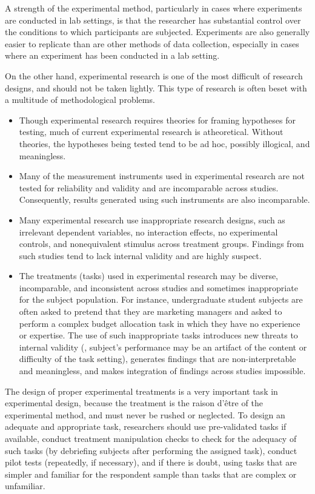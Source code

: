 A strength of the experimental method, particularly in cases where experiments are conducted in lab settings, is that the researcher has substantial control over the conditions to which participants are subjected. Experiments are also generally easier to replicate than are other methods of data collection, especially in cases where an experiment has been conducted in a lab setting.

On the other hand, experimental research is one of the most difficult of research designs, and should not be taken lightly. This type of research is often beset with a multitude of methodological problems. 

\begin{itemize}
	\item Though experimental research requires theories for framing hypotheses for testing, much of current experimental research is atheoretical. Without theories, the hypotheses being tested tend to be ad hoc, possibly illogical, and meaningless. 

	\item Many of the measurement instruments used in experimental research are not tested for reliability and validity and are incomparable across studies. Consequently, results generated using such instruments are also incomparable. 

	\item Many experimental research use inappropriate research designs, such as irrelevant dependent variables, no interaction effects, no experimental controls, and nonequivalent stimulus across treatment groups. Findings from such studies tend to lack internal validity and are highly suspect. 

	\item The treatments (tasks) used in experimental research may be diverse, incomparable, and inconsistent across studies and sometimes inappropriate for the subject population. For instance, undergraduate student subjects are often asked to pretend that they are marketing managers and asked to perform a complex budget allocation task in which they have no experience or expertise. The use of such inappropriate tasks introduces new threats to internal validity (\ie, subject's performance may be an artifact of the content or difficulty of the task setting), generates findings that are non-interpretable and meaningless, and makes integration of findings across studies impossible.
\end{itemize}

The design of proper experimental treatments is a very important task in experimental design, because the treatment is the raison d'\^{e}tre of the experimental method, and must never be rushed or neglected. To design an adequate and appropriate task, researchers should use pre-validated tasks if available, conduct treatment manipulation checks to check for the adequacy of such tasks (by debriefing subjects after performing the assigned task), conduct pilot tests (repeatedly, if necessary), and if there is doubt, using tasks that are simpler and familiar for the respondent sample than tasks that are complex or unfamiliar.

